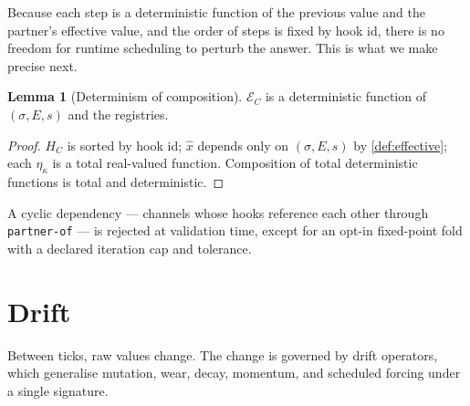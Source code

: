 \documentclass[journal,onecolumn,11pt]{IEEEtran}
\theoremstyle{definition}
\newtheorem{lemma}{Lemma}
\begin{document}
Because each step is a deterministic function of the previous value and the partner's effective value, and the order of steps is fixed by hook id, there is no freedom for runtime scheduling to perturb the answer. This is what we make precise next.

\begin{lemma}[Determinism of composition]\label{lem:comp-det}
$\mathcal{E}_C$ is a deterministic function of $(\sigma, E, s)$ and the registries.
\end{lemma}

\begin{proof}
$H_C$ is sorted by hook id; $\hat{x}$ depends only on $(\sigma, E, s)$ by \cref{def:effective}; each $\eta_\kappa$ is a total real-valued function. Composition of total deterministic functions is total and deterministic.
\end{proof}

A cyclic dependency --- channels whose hooks reference each other through \texttt{partner-of} --- is rejected at validation time, except for an opt-in fixed-point fold with a declared iteration cap and tolerance.

\section{Drift}
\label{sec:drift}

Between ticks, raw values change. The change is governed by drift operators, which generalise mutation, wear, decay, momentum, and scheduled forcing under a single signature.
\end{document}
